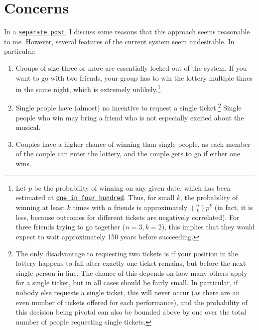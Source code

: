 \documentclass[11pt, oneside]{article}   	%
\newcommand{\link}[2]{{ \color{blue} \tt{\href{#1}{#2}}}}
\begin{document}
\section{Concerns}
In a \link{}{separate post}, I discuss some reasons that this approach seems reasonable to me. However, several features of the current system seem undesirable. In particular:
\begin{enumerate}
\item Groups of size three or more are essentially locked out of the system. If you want to go with two friends, your group has to win the lottery multiple times in the same night, which is extremely unlikely.\footnote{Let $p$ be the probability of winning on any given date, which has been estimated at \link{https://www.timeout.com/newyork/theater/hamilton-lottery}{one in four hundred}. Thus, for small $k$, the probability of winning at least $k$ times with $n$ friends is approximately ${n \choose k} p^k$ (in fact, it is less, because outcomes for different tickets are negatively correlated). For three friends trying to go together ($n = 3, k = 2$), this implies that they would expect to wait approximately 150 years before succeeding.}
\item Single people have (almost) no incentive to request a single ticket.\footnote{The only disadvantage to requesting two tickets is if your position in the lottery happens to fall after exactly one ticket remains, but before the next single person in line. The chance of this depends on how many others apply for a single ticket, but in all cases should be fairly small. In particular, if nobody else requests a single ticket, this will never occur (as there are an even number of tickets offered for each performance), and the probability of this decision being pivotal can also be bounded above by one over the total number of people requesting single tickets.} Single people who win may bring a friend who is not especially excited about the musical.
\item Couples have a higher chance of winning than single people, as each member of the couple can enter the lottery, and the couple gets to go if either one wins.
\end{enumerate}

\newpage
\end{document}
